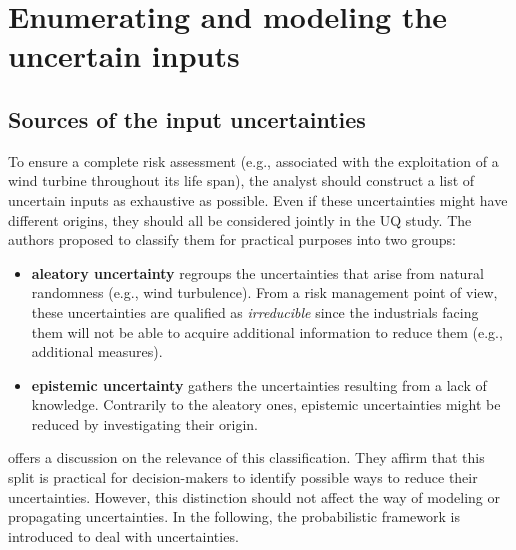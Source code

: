 \section{Enumerating and modeling the uncertain inputs} \label{sec:uq}

\subsection{Sources of the input uncertainties}

To ensure a complete risk assessment (e.g., associated with the exploitation of a wind turbine throughout its life span), the analyst should construct a list of uncertain inputs as exhaustive as possible. 
Even if these uncertainties might have different origins, they should all be considered jointly in the UQ study. 
The authors proposed to classify them for practical purposes into two groups:
\begin{itemize}
    \item \textbf{aleatory uncertainty} regroups the uncertainties that arise from natural randomness (e.g., wind turbulence). 
    From a risk management point of view, these uncertainties are qualified as \textit{irreducible} since the industrials facing them will not be able to acquire additional information to reduce them (e.g., additional measures).     
    \item \textbf{epistemic uncertainty} gathers the uncertainties resulting from a lack of knowledge. 
    Contrarily to the aleatory ones, epistemic uncertainties might be reduced by investigating their origin. 
\end{itemize} 

\citet{kiureghian_2009} offers a discussion on the relevance of this classification. 
They affirm that this split is practical for decision-makers to identify possible ways to reduce their uncertainties. 
However, this distinction should not affect the way of modeling or propagating uncertainties. 
In the following, the probabilistic framework is introduced to deal with uncertainties. 


